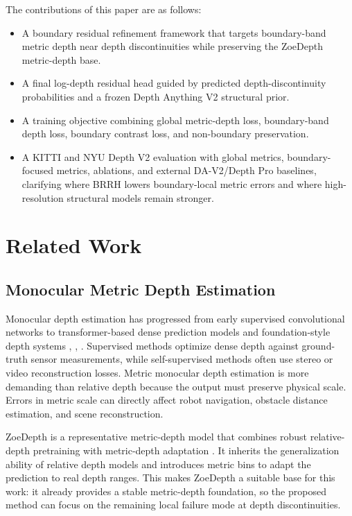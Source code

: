 \documentclass{ieeeaccess}
\begin{document}
The contributions of this paper are as follows:
\begin{itemize}
  \item A boundary residual refinement framework that targets boundary-band metric depth near depth discontinuities while preserving the ZoeDepth metric-depth base.
  \item A final log-depth residual head guided by predicted depth-discontinuity probabilities and a frozen Depth Anything V2 structural prior.
  \item A training objective combining global metric-depth loss, boundary-band depth loss, boundary contrast loss, and non-boundary preservation.
  \item A KITTI and NYU Depth V2 evaluation with global metrics, boundary-focused metrics, ablations, and external DA-V2/Depth Pro baselines, clarifying where BRRH lowers boundary-local metric errors and where high-resolution structural models remain stronger.
\end{itemize}

\section{Related Work}

\subsection{Monocular Metric Depth Estimation}

Monocular depth estimation has progressed from early supervised convolutional networks to transformer-based dense prediction models and foundation-style depth systems \cite{dpt}, \cite{midas}, \cite{newcrfs}. Supervised methods optimize dense depth against ground-truth sensor measurements, while self-supervised methods often use stereo or video reconstruction losses. Metric monocular depth estimation is more demanding than relative depth because the output must preserve physical scale. Errors in metric scale can directly affect robot navigation, obstacle distance estimation, and scene reconstruction.

ZoeDepth is a representative metric-depth model that combines robust relative-depth pretraining with metric-depth adaptation \cite{zoedepth}. It inherits the generalization ability of relative depth models and introduces metric bins to adapt the prediction to real depth ranges. This makes ZoeDepth a suitable base for this work: it already provides a stable metric-depth foundation, so the proposed method can focus on the remaining local failure mode at depth discontinuities.
\end{document}
